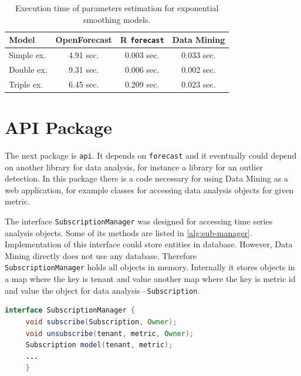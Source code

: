         \begin{table}[h]
            \begin{center}
                \begin{tabular}{l|c|c|c}
                    \textbf{Model} & \textbf{OpenForecast} & \textbf{R \texttt{forecast}} &
                        \textbf{Data Mining}\\ \hline \hline
                    Simple ex. & 4.91 sec. & 0.003 sec. & 0.033 sec.\\
                    Double ex. & 9.31 sec. & 0.006 sec. & 0.002 sec. \\
                    Triple ex. & 6.45 sec. & 0.209 sec. & 0.023 sec. \\
                \end{tabular}
                \caption{Execution time of parameters estimation for exponential smoothing models.}
                \label{tab:datamining-perf}
            \end{center}
        \end{table}

    \section{API Package}
    The next package is \texttt{api}. It depends on \texttt{forecast} and it eventually could
    depend on another library for data analysis, for instance a library for an outlier detection. In this package there
    is a code necessary for using Data Mining as a web application, for example classes for accessing data analysis
    objects for given metric.

    The interface \texttt{SubscriptionManager} was designed for accessing time series analysis objects. Some of its
    methods are listed in \ref{alg:sub-manager}. Implementation of this interface could store entities in database.
    However, Data Mining directly does not use any database. Therefore \\ \texttt{SubscriptionManager} holds all objects
    in memory. Internally it stores objects in a map where the key is tenant and value another map where the key is
    metric id and value the object for data analysis\,--\,\texttt{Subscription}.

    \begin{lstlisting}[caption={Interface \texttt{SubscriptionManager}.}, language=Java, label={alg:sub-manager}]
interface SubscriptionManager {
     void subscribe(Subscription, Owner);
     void unsubscribe(tenant, metric, Owner);
     Subscription model(tenant, metric);
     ...
     }
    \end{lstlisting}

